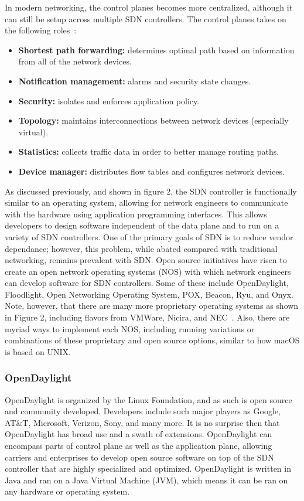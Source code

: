 \documentclass[11pt]{article}
\begin{document}
In modern networking, the control planes becomes more centralized, although it can still be setup across multiple SDN controllers. The control planes takes on the following roles~\cite{Stallings}:
\begin{itemize}
	\item \textbf{Shortest path forwarding:} determines optimal path based on information from all of the network devices.
	\item \textbf{Notification management:} alarms and security state changes.
	\item \textbf{Security:} isolates and enforces application policy.
	\item \textbf{Topology:} maintains interconnections between network devices (especially virtual).
	\item \textbf{Statistics:} collects traffic data in order to better manage routing paths.
	\item \textbf{Device manager:} distributes flow tables and configures network devices.
\end{itemize}

As discussed previously, and shown in figure 2, the SDN controller is functionally similar to an operating system, allowing for network engineers to communicate with the hardware using application programming interfaces. This allows developers to design software independent of the data plane and to run on a variety of SDN controllers. One of the primary goals of SDN is to reduce vendor dependance; however, this problem, while abated compared with traditional networking, remains prevalent with SDN. Open source initiatives have risen to create an open network operating systems (NOS) with which network engineers can develop software for SDN controllers. Some of these include OpenDaylight, Floodlight, Open Networking Operating System, POX, Beacon, Ryu, and Onyx. Note, however, that there are many more proprietary operating systems as shown in Figure 2, including flavors from VMWare, Nicira, and NEC~\cite{Nadeau}. Also, there are myriad ways to implement each NOS, including running variations or combinations of these proprietary and open source options, similar to how macOS is based on UNIX.

\subsubsection{OpenDaylight}

OpenDaylight is organized by the Linux Foundation, and as such is open source and community developed. Developers include such major players \cite{Daylight} as Google, AT\&T, Microsoft, Verizon, Sony, and many more. It is no surprise then that OpenDaylight has broad use and a swath of extensions. OpenDaylight can encompass parts of control plane as well as the application plane, allowing carriers and enterprises to develop open source software on top of the SDN controller that are highly specialized and optimized. OpenDaylight is written in Java and ran on a Java Virtual Machine (JVM), which means it can be ran on any hardware or operating system.
\end{document}
